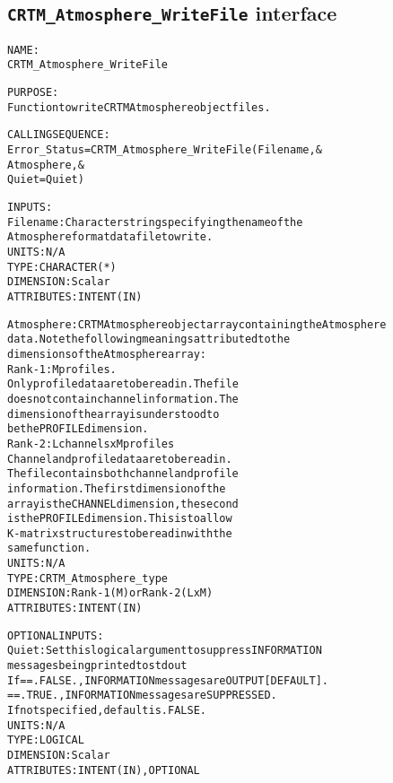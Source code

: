 \subsection{\texttt{CRTM\_Atmosphere\_WriteFile} interface}
  \label{sec:CRTM_Atmosphere_WriteFile_interface}
  \begin{alltt}
 
  NAME:
        CRTM_Atmosphere_WriteFile
 
  PURPOSE:
        Function to write CRTM Atmosphere object files.
 
  CALLING SEQUENCE:
        Error_Status = CRTM_Atmosphere_WriteFile( Filename     , &
                                                  Atmosphere   , &
                                                  Quiet = Quiet  )
 
  INPUTS:
        Filename:     Character string specifying the name of the
                      Atmosphere format data file to write.
                      UNITS:      N/A
                      TYPE:       CHARACTER(*)
                      DIMENSION:  Scalar
                      ATTRIBUTES: INTENT(IN)
 
        Atmosphere:   CRTM Atmosphere object array containing the Atmosphere
                      data. Note the following meanings attributed to the
                      dimensions of the Atmosphere array:
                      Rank-1: M profiles.
                              Only profile data are to be read in. The file
                              does not contain channel information. The
                              dimension of the array is understood to
                              be the PROFILE dimension.
                      Rank-2: L channels  x  M profiles
                              Channel and profile data are to be read in.
                              The file contains both channel and profile
                              information. The first dimension of the
                              array is the CHANNEL dimension, the second
                              is the PROFILE dimension. This is to allow
                              K-matrix structures to be read in with the
                              same function.
                      UNITS:      N/A
                      TYPE:       CRTM_Atmosphere_type
                      DIMENSION:  Rank-1 (M) or Rank-2 (L x M)
                      ATTRIBUTES: INTENT(IN)
 
  OPTIONAL INPUTS:
        Quiet:        Set this logical argument to suppress INFORMATION
                      messages being printed to stdout
                      If == .FALSE., INFORMATION messages are OUTPUT [DEFAULT].
                         == .TRUE.,  INFORMATION messages are SUPPRESSED.
                      If not specified, default is .FALSE.
                      UNITS:      N/A
                      TYPE:       LOGICAL
                      DIMENSION:  Scalar
                      ATTRIBUTES: INTENT(IN), OPTIONAL
 

\end{alltt}
